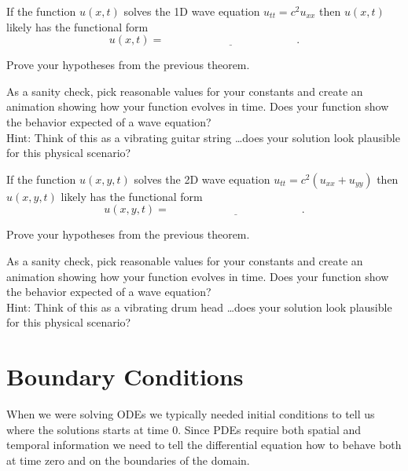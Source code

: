 \begin{thm}
    If the function $u(x,t)$ solves the 1D wave equation $u_{tt} = c^2 u_{xx}$ then
    $u(x,t)$ likely has the functional form
    \[ u(x,t) = \underline{\hspace{2in}}. \]
\end{thm}

\begin{problem}
    Prove your hypotheses from the previous theorem.
\end{problem}

\begin{problem}
    As a sanity check, pick reasonable values for your constants and create an animation
    showing how your function evolves in time.  Does your function show the behavior
    expected of a wave equation?  \\
    Hint: Think of this as a vibrating guitar string \ldots does your solution look
    plausible for this physical scenario?
\end{problem}

\begin{thm}
    If the function $u(x,y,t)$ solves the 2D wave equation $u_{tt} = c^2 \left( u_{xx} +
    u_{yy}
    \right)$ then $u(x,y,t)$ likely has the functional form
    \[ u(x,y,t) = \underline{\hspace{2in}}. \]
\end{thm}

\begin{problem}
    Prove your hypotheses from the previous theorem.
\end{problem}

\begin{problem}
    As a sanity check, pick reasonable values for your constants and create an animation
    showing how your function evolves in time.  Does your function show the behavior
    expected of a wave equation?  \\
    Hint: Think of this as a vibrating drum head \ldots does your solution look
    plausible for this physical scenario?
\end{problem}



\newpage\section{Boundary Conditions}
When we were solving ODEs we typically needed initial conditions to tell us where the
solutions starts at time 0.  Since PDEs require both spatial and temporal information we
need to tell the differential equation how to behave both at time zero and on the
boundaries of the domain.  

